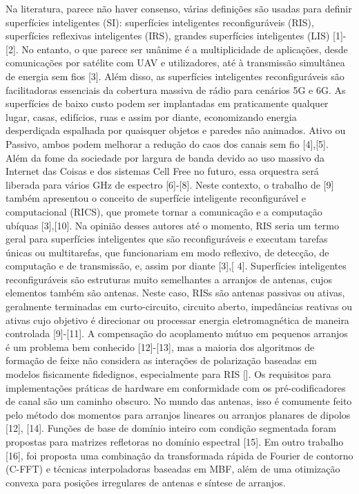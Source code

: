 \documentclass[
	12pt,				%
	openright,			%
	oneside,			%
	a4paper,			%
	english,			%
	brazil				%
	]{abntex2}
\begin{document}
Na literatura, parece não haver consenso, várias definições são usadas para definir superfícies inteligentes (SI): superfícies inteligentes reconfiguráveis ​​(RIS), superfícies reflexivas inteligentes (IRS), grandes superfícies inteligentes (LIS) [1]-[2]. No entanto, o que parece ser unânime é a multiplicidade de aplicações, desde comunicações por satélite com UAV e utilizadores, até à transmissão simultânea de energia sem fios [3]. Além disso, as superfícies inteligentes reconfiguráveis ​​são facilitadoras essenciais da cobertura massiva de rádio para cenários 5G e 6G. As superfícies de baixo custo podem ser implantadas em praticamente qualquer lugar, casas, edifícios, ruas e assim por diante, economizando energia desperdiçada espalhada por quaisquer objetos e paredes não animados. Ativo ou Passivo, ambos podem melhorar a redução do caos dos canais sem fio [4],[5]. Além da fome da sociedade por largura de banda devido ao uso massivo da Internet das Coisas e dos sistemas Cell Free no futuro, essa orquestra será liberada para vários GHz de espectro [6]-[8].
Neste contexto, o trabalho de [9] também apresentou o conceito de superfície inteligente reconfigurável e computacional (RICS), que promete tornar a comunicação e a computação ubíquas [3],[10]. Na opinião desses autores até o momento, RIS seria um termo geral para superfícies inteligentes que são reconfiguráveis ​​e executam tarefas únicas ou multitarefas, que funcionariam em modo reflexivo, de detecção, de computação e de transmissão, e, assim por diante [3],[ 4]. Superfícies inteligentes reconfiguráveis ​​são estruturas muito semelhantes a arranjos de antenas, cujos elementos também são antenas. Neste caso, RISs são antenas passivas ou ativas, geralmente terminadas em curto-circuito, circuito aberto, impedâncias reativas ou ativas cujo objetivo é direcionar ou processar energia eletromagnética de maneira controlada [9]-[11].
A compensação do acoplamento mútuo em pequenos arranjos é um problema bem conhecido [12]-[13], mas a maioria dos algoritmos de formação de feixe não considera as interações de polarização baseadas em modelos fisicamente fidedignos, especialmente para RIS []. Os requisitos para implementações práticas de hardware em conformidade com os pré-codificadores de canal são um caminho obscuro. No mundo das antenas, isso é comumente feito pelo método dos momentos para arranjos lineares ou arranjos planares de dipolos [12], [14]. Funções de base de domínio inteiro com condição segmentada foram propostas para matrizes refletoras no domínio espectral [15]. Em outro trabalho [16], foi proposta uma combinação da transformada rápida de Fourier de contorno (C-FFT) e técnicas interpoladoras baseadas em MBF, além de uma otimização convexa para posições irregulares de antenas e síntese de arranjos.
\end{document}
